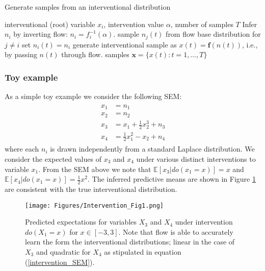 \documentclass[]{article}
\begin{document}
\begin{algorithm}[hb]
   \caption{Generate samples from an interventional distribution}
   \label{alg:internvention}
\begin{algorithmic}
     interventional (root) variable $x_i$, intervention value $\alpha$, number of samples $T$
   \STATE Infer $n_i$ by inverting flow: $n_i = f_i^{-1}( \alpha)$. 
   \STATE sample $n_j(t)$ from flow base distribution for $j\neq i$
   \STATE set $n_i(t) = n_i$
   \STATE generate interventional sample as $x(t) = \mathbf{f}( n(t))$, i.e., 
   by passing $n(t)$ through flow. 
   \ENDFOR
   \RETURN samples $\mathbf{x} = \{x(t): t=1, \ldots, T\}$
\end{algorithmic}
\end{algorithm}

\subsubsection*{Toy example}
As a simple toy example we consider the following SEM:
\begin{align}
\begin{split}
\label{intervention_SEM}
x_1 &= n_1\\
x_2 &= n_2\\
x_3 &= x_1 + \frac{1}{2} x_2^3 + n_3\\
x_4 &= \frac{1}{2} x_1^2 - x_2 + n_4
\end{split}
\end{align}
where each $n_i$ is drawn independently from a standard Laplace distribution. 
We consider the expected values of $x_3$ and $x_4$ under various distinct 
interventions to variable $x_1$. 
From the SEM above we note that 
$\mathbb{E}[x_3 | do(x_1=x)] = x $ and 
$\mathbb{E}[x_4 | do(x_1=x)] =  \frac{1}{2} x^2 $.
The inferred predictive means are shown in Figure \ref{Fig:interventionExample1}
are consistent with the true interventional distribution.  

\begin{figure}[ht]
	\vskip 0.2in
	\begin{center}
		\centerline{\texttt{[image: Figures/Intervention\_Fig1.png]}}
		\caption{Predicted expectations for variables $X_3$ and $X_4$ under intervention $do(X_1=x)$ for $x\in [-3, 3]$. Note that 
		flow is able to accurately learn the form the interventional distributions; linear in the case of $X_3$ and
		quadratic for $X_4$ as stipulated in equation (\ref{intervention_SEM}).   }
		\label{Fig:interventionExample1}
	\end{center}
	\vskip -0.2in
\end{figure}
\end{document}
